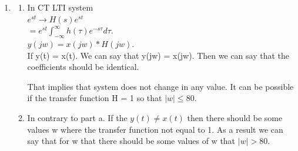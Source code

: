 \documentclass[10pt,a4paper, margin=1in]{article}
\begin{document}
\begin{enumerate}
\begin{enumerate}
    \end{enumerate}
    
\item %
    \begin{enumerate}
    \item %
    In CT LTI system \\

    $e^{st} \rightarrow H(s)e^{st}$ \\

    $= e^{st} \int_{-\infty}^{\infty}h(\tau)e^{-s\tau}d\tau$. \\
    
    $y(jw) = x(jw) * H(jw)$. \\
    
    If y(t) = x(t). We can say that y(jw) = x(jw). Then we can say that the coefficients should be identical.

    That implies that system does not change in any value. It can be possible if the transfer function H = 1 so that $|w| \leq 80$.

    \item %
    In contrary to part a. If the $y(t) \neq x(t)$ then there should be some values w where the transfer function not equal to 1. As a result we can say that for w that there should be some values of w that $|w| > 80$.
    \end{enumerate}    
	

\end{enumerate}
\end{document}
